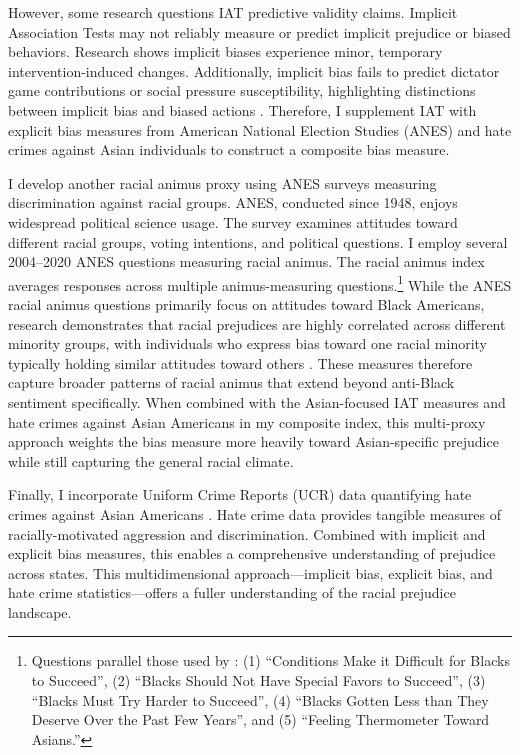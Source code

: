 However, some research questions IAT predictive validity claims. Implicit Association Tests may not reliably measure or predict implicit prejudice or biased behaviors. Research shows implicit biases experience minor, temporary intervention-induced changes. Additionally, implicit bias fails to predict dictator game contributions or social pressure susceptibility, highlighting distinctions between implicit bias and biased actions \autocite{arkesAttributionsImplicitPrejudice2004,forscherMetaanalysisProceduresChange2019,leeDoesImplicitBias2018}. Therefore, I supplement IAT with explicit bias measures from American National Election Studies (ANES) and hate crimes against Asian individuals to construct a composite bias measure.

I develop another racial animus proxy using ANES surveys \autocite{anes2021} measuring discrimination against racial groups. ANES, conducted since 1948, enjoys widespread political science usage. The survey examines attitudes toward different racial groups, voting intentions, and political questions. I employ several 2004--2020 ANES questions measuring racial animus. The racial animus index averages responses across multiple animus-measuring questions.\footnote{Questions parallel those used by \textcite{charlesPrejudiceWagesEmpirical2008}: (1) ``Conditions Make it Difficult for Blacks to Succeed'', (2) ``Blacks Should Not Have Special Favors to Succeed'', (3) ``Blacks Must Try Harder to Succeed'', (4) ``Blacks Gotten Less than They Deserve Over the Past Few Years'', and (5) ``Feeling Thermometer Toward Asians.''} While the ANES racial animus questions primarily focus on attitudes toward Black Americans, research demonstrates that racial prejudices are highly correlated across different minority groups, with individuals who express bias toward one racial minority typically holding similar attitudes toward others \autocite{almasalkhi2023links, mora2020antiblackness}. These measures therefore capture broader patterns of racial animus that extend beyond anti-Black sentiment specifically. When combined with the Asian-focused IAT measures and hate crimes against Asian Americans in my composite index, this multi-proxy approach weights the bias measure more heavily toward Asian-specific prejudice while still capturing the general racial climate.

Finally, I incorporate Uniform Crime Reports (UCR) data quantifying hate crimes against Asian Americans \autocite{ucrbook}. Hate crime data provides tangible measures of racially-motivated aggression and discrimination. Combined with implicit and explicit bias measures, this enables a comprehensive understanding of prejudice across states. This multidimensional approach---implicit bias, explicit bias, and hate crime statistics---offers a fuller understanding of the racial prejudice landscape.

